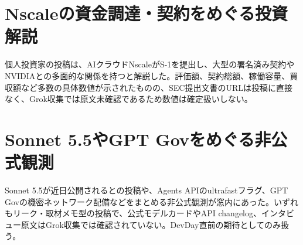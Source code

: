 \section{Nscaleの資金調達・契約をめぐる投資解説}
個人投資家の投稿は、AIクラウドNscaleがS-1を提出し、大型の署名済み契約やNVIDIAとの多面的な関係を持つと解説した。評価額、契約総額、稼働容量、買収額など多数の具体数値が示されたものの、SEC提出文書のURLは投稿に直接なく、Grok収集では原文未確認であるため数値は確定扱いしない。

\section{Sonnet 5.5やGPT Govをめぐる非公式観測}
Sonnet 5.5が近日公開されるとの投稿や、Agents APIのultrafastフラグ、GPT Govの機密ネットワーク配備などをまとめる非公式観測が窓内にあった。いずれもリーク・取材メモ型の投稿で、公式モデルカードやAPI changelog、インタビュー原文はGrok収集では確認されていない。DevDay直前の期待としてのみ扱う。
